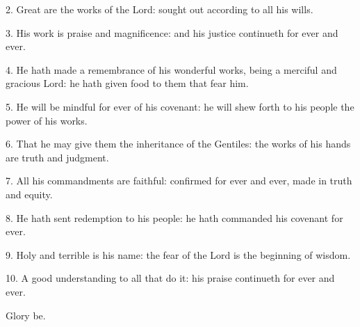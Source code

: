  
 2. Great are the works of the Lord: sought out according to all his wills.
 
 3. His work is praise and magnificence: and his justice continueth for ever and ever.
 
 4.  He hath made a remembrance of his wonderful works, being a merciful and gracious Lord: he hath given food to them that fear him. 	
 
 5. He will be mindful for ever of his covenant: he will shew forth to his people the power of his works.
 
 6. That he may give them the inheritance of the Gentiles: the works of his hands are truth and judgment.
 
 7. All his commandments are faithful: confirmed for ever and ever, made in truth and equity.
 
 8. He hath sent redemption to his people: he hath commanded his covenant for ever.
 
 9. Holy and terrible is his name: the fear of the Lord is the beginning of wisdom.
 
 10. A good understanding to all that do it: his praise continueth for ever and ever. 
 
Glory be.